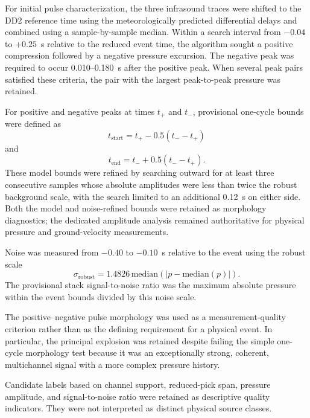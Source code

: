 \documentclass[]{seismica}
\begin{document}
For initial pulse characterization, the three infrasound traces were shifted to the DD2 reference time using the meteorologically predicted differential delays and combined using a sample-by-sample median. Within a search interval from $-0.04$ to $+0.25$~s relative to the reduced event time, the algorithm sought a positive compression followed by a negative pressure excursion. The negative peak was required to occur 0.010--0.180~s after the positive peak. When several peak pairs satisfied these criteria, the pair with the largest peak-to-peak pressure was retained.

For positive and negative peaks at times $t_+$ and $t_-$, provisional one-cycle bounds were defined as
\begin{equation}
  t_{\mathrm{start}} = t_+ - 0.5(t_- - t_+)
  \label{eq:pulse_start}
\end{equation}
and
\begin{equation}
  t_{\mathrm{end}} = t_- + 0.5(t_- - t_+).
  \label{eq:pulse_end}
\end{equation}
These model bounds were refined by searching outward for at least three
consecutive samples whose absolute amplitudes were less than twice the robust
background scale, with the search limited to an additional 0.12~s on either
side. Both the model and noise-refined bounds were retained as morphology
diagnostics; the dedicated amplitude analysis remained authoritative for
physical pressure and ground-velocity measurements.

Noise was measured from $-0.40$ to $-0.10$~s relative to the event using the robust scale
\begin{equation}
  \sigma_{\mathrm{robust}} = 1.4826\,\mathrm{median}\left(\left|p-\mathrm{median}(p)\right|\right).
  \label{eq:robust_noise}
\end{equation}
The provisional stack signal-to-noise ratio was the maximum absolute pressure within the event bounds divided by this noise scale.

The positive--negative pulse morphology was used as a measurement-quality criterion rather than as the defining requirement for a physical event. In particular, the principal explosion was retained despite failing the simple one-cycle morphology test because it was an exceptionally strong, coherent, multichannel signal with a more complex pressure history.

Candidate labels based on channel support, reduced-pick span, pressure amplitude, and signal-to-noise ratio were retained as descriptive quality indicators. They were not interpreted as distinct physical source classes.
\end{document}
